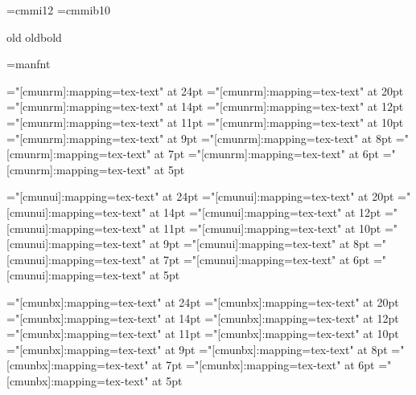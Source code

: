

%

\setfonts[/11pt]
\setfonts[CMRoman/]
\def\smallish{\setfonts[/mag.9]}
\def\smaller{\setfonts[/mag.8]}
\def\smallest{\setfonts[/mag.7]}
\def\larger{\setfonts[/mag1.2]}
\def\largest{\setfonts[/mag1.3]}
\font\twelvei=cmmi12
\font\tenmib=cmmib10
\def\xiioldrm{ \twelvei\relax}
\def\xoldbf{\tenmib\relax}

\DefStyle old     {\xiioldrm}
\DefStyle oldbold {\xoldbf}


\font\manual=manfnt

\def\scshape{%
\font\sc="[cmunrm]:+smcp:mapping=tex-text" at \fontdimen6\font
\sc%
}

\font\twentyfourrm="[cmunrm]:mapping=tex-text"  at 24pt
\font\twentyrm="[cmunrm]:mapping=tex-text"      at 20pt
\font\fourteenrm="[cmunrm]:mapping=tex-text"    at 14pt
\font\twelverm="[cmunrm]:mapping=tex-text"      at 12pt
\font\elevenrm="[cmunrm]:mapping=tex-text"      at 11pt
\font\tenrm="[cmunrm]:mapping=tex-text"         at 10pt
\font\ninerm="[cmunrm]:mapping=tex-text"        at 9pt
\font\eightrm="[cmunrm]:mapping=tex-text"       at 8pt
\font\sevenrm="[cmunrm]:mapping=tex-text"       at 7pt
\font\sixrm="[cmunrm]:mapping=tex-text"         at 6pt
\font\fiverm="[cmunrm]:mapping=tex-text"        at 5pt

\font\twentyfourui="[cmunui]:mapping=tex-text"  at 24pt
\font\twentyui="[cmunui]:mapping=tex-text"      at 20pt
\font\fourteenui="[cmunui]:mapping=tex-text"    at 14pt
\font\twelveui="[cmunui]:mapping=tex-text"      at 12pt
\font\elevenui="[cmunui]:mapping=tex-text"      at 11pt
\font\tenui="[cmunui]:mapping=tex-text"         at 10pt
\font\nineui="[cmunui]:mapping=tex-text"        at 9pt
\font\eightui="[cmunui]:mapping=tex-text"       at 8pt
\font\sevenui="[cmunui]:mapping=tex-text"       at 7pt
\font\sixui="[cmunui]:mapping=tex-text"         at 6pt
\font\fiveui="[cmunui]:mapping=tex-text"        at 5pt

\font\twentyfourbf="[cmunbx]:mapping=tex-text"  at 24pt
\font\twentybf="[cmunbx]:mapping=tex-text"      at 20pt
\font\fourteenbf="[cmunbx]:mapping=tex-text"    at 14pt
\font\twelvebf="[cmunbx]:mapping=tex-text"      at 12pt
\font\elevenbf="[cmunbx]:mapping=tex-text"      at 11pt
\font\tenbf="[cmunbx]:mapping=tex-text"         at 10pt
\font\ninebf="[cmunbx]:mapping=tex-text"        at 9pt
\font\eightbf="[cmunbx]:mapping=tex-text"       at 8pt
\font\sevenbf="[cmunbx]:mapping=tex-text"       at 7pt
\font\sixbf="[cmunbx]:mapping=tex-text"         at 6pt
\font\fivebf="[cmunbx]:mapping=tex-text"        at 5pt

